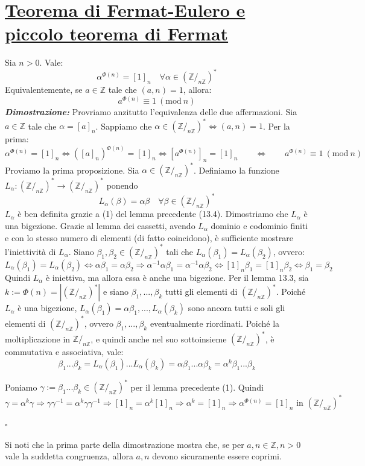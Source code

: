 \documentclass[oneside]{book}
\theoremstyle{remark}
\newcommand{\teorema}[1]{\section{\underline{#1}}}
\newcommand{\Mod}[1]{\ (\mathrm{mod}\ #1)} %
\newcommand{\cvd}{\begin{flushright}$\square$\end{flushright}} %
\begin{document}
\teorema{Teorema di Fermat-Eulero e piccolo teorema di Fermat}\label{fermateuler}
\begin{tcolorbox}[title={Teorema di Fermat-Eulero}]
Sia $n>0$. Vale:
\[ \alpha^{\Phi(n)} = [1]_n \quad \forall\alpha\in(\mathbb{Z}/_{n\mathbb{Z}})^* \]
Equivalentemente, se $a\in\mathbb{Z}$ tale che $(a,n)=1$, allora:
\[ a^{\Phi(n)} \equiv 1 \Mod{n} \]
\textit{\textbf{Dimostrazione:}} Provriamo anzitutto l'equivalenza delle due
affermazioni. Sia $a\in\mathbb{Z}$ tale che $\alpha = [a]_n$. Sappiamo che
$\alpha \in (\mathbb{Z}/_{n\mathbb{Z}})^* \Longleftrightarrow (a,n)=1$. Per
la prima: \[ \alpha^{\Phi(n)} = [1]_n \Longleftrightarrow ([a]_n)^{\Phi(n)} = [1]_n \Longleftrightarrow [a^{\Phi(n)}]_n = [1]_n \qquad \Longleftrightarrow \qquad a^{\Phi(n)} \equiv 1 \Mod{n}  \]
Proviamo la prima proposizione. Sia $\alpha\in (\mathbb{Z}/_{n\mathbb{Z}})^*$.
Definiamo la funzione $L_\alpha:(\mathbb{Z}/_{n\mathbb{Z}})^* \to (\mathbb{Z}/_{n\mathbb{Z}})^*$
ponendo \[L_\alpha(\beta) = \alpha\beta \quad \forall\beta\in(\mathbb{Z}/_{n\mathbb{Z}})^* \]
$L_\alpha$ è ben definita grazie a (1) del lemma precedente (13.4).
Dimostriamo che $L_\alpha$ è una bigezione. Grazie al lemma dei cassetti,
avendo $L_\alpha$ dominio e codominio finiti e con lo stesso numero di elementi
(di fatto coincidono), è sufficiente mostrare l'iniettività di $L_\alpha$.
Siano $\beta_1,\beta_2 \in (\mathbb{Z}/_{n\mathbb{Z}})^*$ tali che
$L_\alpha(\beta_1)=L_\alpha(\beta_2)$, ovvero:
\[ L_\alpha(\beta_1) = L_\alpha(\beta_2) \Longleftrightarrow \alpha\beta_1 = \alpha\beta_2
\Longrightarrow \alpha^{-1}\alpha\beta_1 = \alpha^{-1}\alpha\beta_2 \Longleftrightarrow [1]_n\beta_1 = [1]_n\beta_2 \Longleftrightarrow \beta_1 = \beta_2\]
Quindi $L_\alpha$ è iniettiva, ma allora essa è anche una bigezione.
Per il lemma 13.3, sia $k:=\Phi(n)=|(\mathbb{Z}/_{n\mathbb{Z}})^*|$ e siano
$\beta_1,...,\beta_k$ tutti gli elementi di $(\mathbb{Z}/_{n\mathbb{Z}})^*$.
Poiché $L_\alpha$ è una bigezione, $L_\alpha(\beta_1)=\alpha\beta_1,...,L_\alpha(\beta_k)$
sono ancora tutti e soli gli elementi di $(\mathbb{Z}/_{n\mathbb{Z}})^*$,
ovvero $\beta_1,...,\beta_k$ eventualmente riordinati.
Poiché la moltiplicazione in $\mathbb{Z}/_{n\mathbb{Z}}$, e quindi anche nel
suo sottoinsieme $(\mathbb{Z}/_{n\mathbb{Z}})^*$, è commutativa e
associativa, vale:
\[ \beta_1...\beta_k = L_\alpha(\beta_1)...L_\alpha(\beta_k) = \alpha\beta_1...\alpha\beta_k = \alpha^k\beta_1...\beta_k \]

Poniamo $\gamma := \beta_1...\beta_k \in (\mathbb{Z}/_{n\mathbb{Z}})^*$ per il lemma precedente (1). Quindi
\[ \gamma=\alpha^k\gamma \Longrightarrow \gamma\gamma^{-1}=\alpha^k\gamma\gamma^{-1}
\Longrightarrow [1]_n = \alpha^k[1]_n \Longrightarrow \alpha^k = [1]_n \Longrightarrow \alpha^{\Phi(n)} = [1]_n \text{ in } (\mathbb{Z}/_{n\mathbb{Z}})^* \]
\cvd
\end{tcolorbox}
Si noti che la prima parte della dimostrazione mostra che, se per
$a,n\in\mathbb{Z},n>0$ vale la suddetta congruenza, allora $a,n$ devono
sicuramente essere coprimi.
\end{document}
